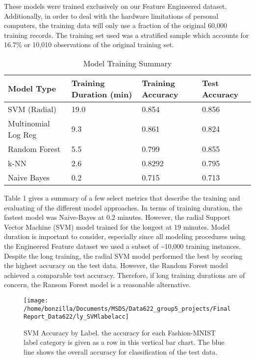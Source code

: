 \documentclass{article}
\begin{document}
These models were trained exclusively on our Feature Engineered dataset.
Additionally, in order to deal with the hardware limitations of personal
computers, the training data will only use a fraction of the original
60,000 training records. The training set used was a stratified sample
which accounts for 16.7\% or 10,010 observations of the original
training set.

\begin{table}
 \caption{Model Training Summary}
  \centering
  \begin{tabular}{llll}
    \toprule
    Model Type     & Training Duration (min)  & Training Accuracy & Test Accuracy \\
    \midrule
    SVM (Radial) & 19.0  & 0.854 & 0.856 \\
    Multinomial Log Reg     & 9.3  &  0.861 & 0.824 \\
    Random Forest     & 5.5  &  0.799 & 0.855 \\
    k-NN     & 2.6  &  0.8292 & 0.795 \\    
    Naive Bayes     & 0.2  & 0.715 & 0.713 \\    
    \bottomrule
  \end{tabular}
  \label{tab:table}
\end{table}

Table 1 gives a summary of a few select metrics that describe the
training and evaluating of the different model approaches. In terms of
training duration, the fastest model was Naive-Bayes at 0.2 minutes.
However, the radial Support Vector Machine (SVM) model trained for the
longest at 19 minutes. Model duration is important to consider,
especially since all modeling procedures using the Engineered Feature
dataset we used a subset of \textasciitilde10,000 training instances.
Despite the long training, the radial SVM model performed the best by
scoring the highest accuracy on the test data. However, the Random
Forest model achieved a comparable test accuracy. Therefore, if long
training durations are of concern, the Ransom Forest model is a
reasonable alternative.

\begin{figure}

{\centering \texttt{[image: /home/bonzilla/Documents/MSDS/Data622\_group5\_projects/FinalReport\_Data622/ly\_SVMlabelacc]} 

}

\caption{SVM Accuracy by Label. the accuracy for each Fashion-MNIST label category is given as a row in this vertical bar chart. The blue line shows the overall accuracy for classification of the test data.}\label{fig:unnamed-chunk-4}
\end{figure}
\end{document}
